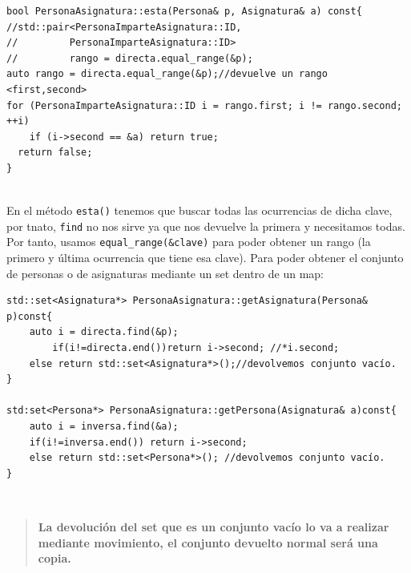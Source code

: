 \begin{lstlisting}[frame=single]
bool PersonaAsignatura::esta(Persona& p, Asignatura& a) const{ 
//std::pair<PersonaImparteAsignatura::ID,
//         PersonaImparteAsignatura::ID>
//         rango = directa.equal_range(&p);
auto rango = directa.equal_range(&p);//devuelve un rango <first,second>
for (PersonaImparteAsignatura::ID i = rango.first; i != rango.second; ++i)
    if (i->second == &a) return true;
  return false;
}
\end{lstlisting}\\
En el método \texttt {esta()} tenemos que buscar todas las ocurrencias de dicha clave, por tnato, \texttt{find} no nos sirve ya que nos devuelve la primera y necesitamos todas. Por tanto, usamos \texttt{equal\_range(&clave)}
 para poder obtener un rango (la primero y última ocurrencia que tiene esa clave).
Para poder obtener el conjunto de personas o de asignaturas mediante un set dentro de un map:
\begin{lstlisting}[frame=single]
std::set<Asignatura*> PersonaAsignatura::getAsignatura(Persona& p)const{
	auto i = directa.find(&p);
		if(i!=directa.end())return i->second; //*i.second;
	else return std::set<Asignatura*>();//devolvemos conjunto vacío.
}

std:set<Persona*> PersonaAsignatura::getPersona(Asignatura& a)const{
	auto i = inversa.find(&a);
	if(i!=inversa.end()) return i->second;
	else return std::set<Persona*>(); //devolvemos conjunto vacío.
}
\end{lstlisting}\\
\begin{quote}
	\textbf{La devolución del set que es un conjunto vacío lo va a realizar mediante movimiento, el conjunto devuelto normal será una copia.}
\end{quote}
\newpage
